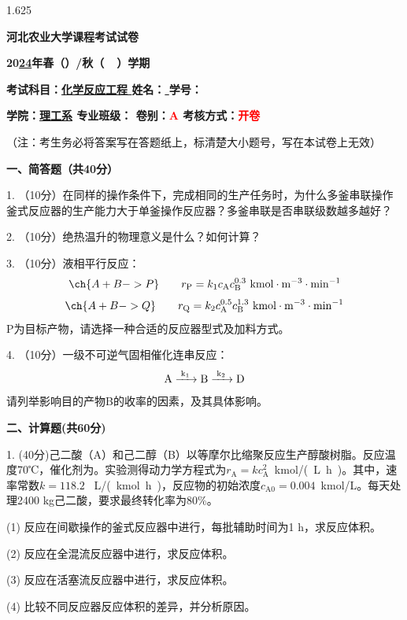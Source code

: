 \documentclass[12pt, b5paper]{article}
\newcommand*{\cred}{\textcolor{red}}
\begin{document}
\begin{spacing}{1.625}

\centerline{{\huge \bf{河北农业大学课程考试试卷}}}

\centerline{\bf{\large 20\underline{24}年春（\quad ）/秋（\ \surd \ ）学期}}

{\bf{考试科目：\underline{\quad 化学反应工程 \quad} \hfill 姓名：\underline{ \qquad \qquad} \hfill 学号：\underline{ \qquad \qquad \qquad \qquad}}}

{\bf{学院：\underline{\quad 理工系\quad } \hfill 专业班级：\underline{\qquad \qquad \qquad \qquad} \hfill 卷别：\cred{A} \hfill 考核方式：\cred{开卷}}}

（注：考生务必将答案写在答题纸上，标清楚大小题号，写在本试卷上无效）

\bigskip


{\bf{一、简答题（共40分）}}

1. （10分）在同样的操作条件下，完成相同的生产任务时，为什么多釜串联操作釜式反应器的生产能力大于单釜操作反应器？多釜串联是否串联级数越多越好？

\bigskip

2. （10分）绝热温升的物理意义是什么？如何计算？

\bigskip

3. （10分）液相平行反应：
\[
	\ch{A + B -> P} \qquad r_\mathrm{P} = k_1c_\mathrm{A}c_\mathrm{B}^{0.3} \ \mathrm{kmol\cdot m^{-3}\cdot min^{-1}}
\]
\[
	\ch{A + B -> Q} \qquad r_\mathrm{Q} = k_2c_\mathrm{A}^{0.5}c_\mathrm{B}^{1.3} \ \mathrm{kmol\cdot m^{-3}\cdot min^{-1}}
\]
P为目标产物，请选择一种合适的反应器型式及加料方式。

\bigskip

4. （10分）一级不可逆气固相催化连串反应：
\[
	\ce{A ->[k_1] B ->[k_2] D}
\]
请列举影响目的产物B的收率的因素，及其具体影响。


\newpage
{\bf{二、计算题(共60分)}}

1. (40分)己二酸（A）和己二醇（B）以等摩尔比缩聚反应生产醇酸树脂。反应温度70℃，催化剂为。实验测得动力学方程式为$r_\mathrm{A} = kc_\mathrm{A}^2$\ \si{kmol/(L.h)}。其中，速率常数$k = 118.2$ \ \si{L/(kmol.h)}，反应物的初始浓度$c_\mathrm{A0} = 0.004$\ \si{kmol/L}。每天处理2400 kg己二酸，要求最终转化率为80\%。

(1) 反应在间歇操作的釜式反应器中进行，每批辅助时间为1 h，求反应体积。

(2) 反应在全混流反应器中进行，求反应体积。

(3) 反应在活塞流反应器中进行，求反应体积。

(4) 比较不同反应器反应体积的差异，并分析原因。



\end{spacing}
\end{document}
